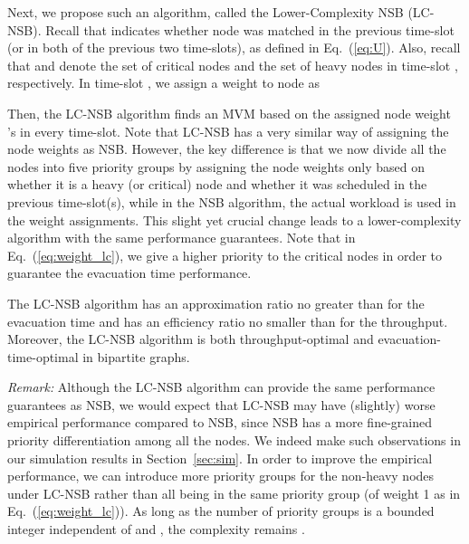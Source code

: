 \documentclass[10pt,journal,compsoc]{IEEEtran}
\newcommand{\HIGH}[1]{{\color{black}{#1}}}
\newcommand{\high}[1]{{\color{black}{#1}}}
\begin{document}
Next, we propose such an algorithm, called the Lower-Complexity NSB (LC-NSB). 
\high{Similarly as in NSB, we consider frames each consisting of three consecutive time-slots.}
Recall that  indicates whether node  was matched in the previous time-slot (or in both of the previous two time-slots),
as defined in Eq.~(\ref{eq:U}). Also, recall that  and  denote the set of critical nodes and 
the set of heavy nodes in time-slot , respectively. In time-slot , we assign a weight to node  as



Then, the LC-NSB algorithm finds an MVM based on the assigned node weight 's in every time-slot. 
Note that LC-NSB has a very similar way of assigning the node weights as NSB. However, the key difference 
is that we now divide all the nodes into five priority groups by assigning the node weights only based on 
whether it is a heavy (or critical) node and whether it was scheduled in the previous time-slot(s), while in 
the NSB algorithm, the actual workload is used in the weight assignments. This slight yet crucial change 
leads to a lower-complexity algorithm with the same performance guarantees. Note that in Eq.~(\ref{eq:weight_lc}), 
we give a higher priority to the critical nodes in order to guarantee the evacuation time performance.
\HIGH{The proof follows a similar line of analysis to that for the NSB algorithm and is provided in the appendix for completeness.}

\begin{theorem}
\label{thm:lc_nsb}
The LC-NSB algorithm has an approximation ratio no greater than  for the evacuation time and has an 
efficiency ratio no smaller than  for the throughput. 
Moreover, the LC-NSB algorithm is both throughput-optimal and evacuation-time-optimal in bipartite graphs.
\end{theorem}



\emph{Remark:} Although the LC-NSB algorithm can provide the same performance guarantees as NSB, 
we would expect that LC-NSB may have (slightly) worse empirical performance compared to NSB, since 
NSB has a more fine-grained priority differentiation among all the nodes. We indeed make such observations 
in our simulation results in Section~\ref{sec:sim}. In order to improve the empirical performance, we can 
introduce more priority groups for the non-heavy nodes under LC-NSB rather than all being in the same 
priority group (of weight 1 as in Eq.~(\ref{eq:weight_lc})). As long as the number of priority groups is 
a bounded integer independent of  and , the complexity remains .
\end{document}
